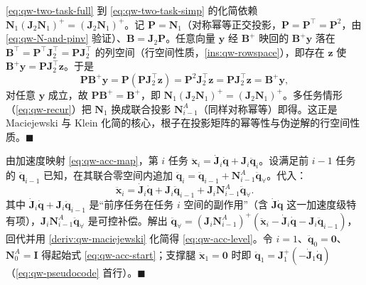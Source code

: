 \begin{derivation}[双任务化简恒等式 $\boldsymbol{N}_1(\boldsymbol{J}_2\boldsymbol{N}_1)^+=(\boldsymbol{J}_2\boldsymbol{N}_1)^+$ 的来由]\label{deriv:qw-maciejewski}
\cref{eq:qw-two-task-full} 到 \cref{eq:qw-two-task-simp} 的化简依赖 $\boldsymbol{N}_1(\boldsymbol{J}_2\boldsymbol{N}_1)^+=(\boldsymbol{J}_2\boldsymbol{N}_1)^+$。记 $\boldsymbol{P}=\boldsymbol{N}_1$（对称幂等正交投影，$\boldsymbol{P}=\boldsymbol{P}^\top=\boldsymbol{P}^2$，由 \cref{eq:qw-N-and-pinv} 验证）、$\boldsymbol{B}=\boldsymbol{J}_2\boldsymbol{P}$。任意向量 $\boldsymbol{y}$ 经 $\boldsymbol{B}^+$ 映回的 $\boldsymbol{B}^+\boldsymbol{y}$ 落在 $\boldsymbol{B}^\top=\boldsymbol{P}^\top\boldsymbol{J}_2^\top=\boldsymbol{P}\boldsymbol{J}_2^\top$ 的列空间（行空间性质，\cref{ins:qw-rowspace}），即存在 $\boldsymbol{z}$ 使 $\boldsymbol{B}^+\boldsymbol{y}=\boldsymbol{P}\boldsymbol{J}_2^\top\boldsymbol{z}$。于是
\[
  \boldsymbol{P}\boldsymbol{B}^+\boldsymbol{y}=\boldsymbol{P}(\boldsymbol{P}\boldsymbol{J}_2^\top\boldsymbol{z})=\boldsymbol{P}^2\boldsymbol{J}_2^\top\boldsymbol{z}=\boldsymbol{P}\boldsymbol{J}_2^\top\boldsymbol{z}=\boldsymbol{B}^+\boldsymbol{y},
\]
对任意 $\boldsymbol{y}$ 成立，故 $\boldsymbol{P}\boldsymbol{B}^+=\boldsymbol{B}^+$，即 $\boldsymbol{N}_1(\boldsymbol{J}_2\boldsymbol{N}_1)^+=(\boldsymbol{J}_2\boldsymbol{N}_1)^+$。多任务情形（\cref{eq:qw-recur}）把 $\boldsymbol{N}_1$ 换成联合投影 $\boldsymbol{N}_{i-1}^A$（同样对称幂等）即得。这正是 Maciejewski 与 Klein\cite{maciejewski1985obstacle} 化简的核心，根子在投影矩阵的幂等性与伪逆解的行空间性质。$\blacksquare$
\end{derivation}

\begin{derivation}\label{deriv:qw-acc-recur}
由加速度映射 \cref{eq:qw-acc-map}，第 $i$ 任务 $\ddot{\boldsymbol{x}}_i=\dot{\boldsymbol{J}}_i\dot{\boldsymbol{q}}+\boldsymbol{J}_i\ddot{\boldsymbol{q}}_i$。设满足前 $i-1$ 任务的 $\ddot{\boldsymbol{q}}_{i-1}$ 已知，在其联合零空间内追加 $\ddot{\boldsymbol{q}}_i=\ddot{\boldsymbol{q}}_{i-1}+\boldsymbol{N}_{i-1}^A\ddot{\boldsymbol{q}}_{\forall}$。代入：
\[
  \ddot{\boldsymbol{x}}_i=\dot{\boldsymbol{J}}_i\dot{\boldsymbol{q}}+\boldsymbol{J}_i\ddot{\boldsymbol{q}}_{i-1}+\boldsymbol{J}_i\boldsymbol{N}_{i-1}^A\ddot{\boldsymbol{q}}_{\forall}.
\]
其中 $\dot{\boldsymbol{J}}_i\dot{\boldsymbol{q}}+\boldsymbol{J}_i\ddot{\boldsymbol{q}}_{i-1}$ 是“前序任务在任务 $i$ 空间的副作用”（含 $\dot{\boldsymbol{J}}\dot{\boldsymbol{q}}$ 这一加速度级特有项），$\boldsymbol{J}_i\boldsymbol{N}_{i-1}^A\ddot{\boldsymbol{q}}_{\forall}$ 是可控补偿。解出 $\ddot{\boldsymbol{q}}_{\forall}=(\boldsymbol{J}_i\boldsymbol{N}_{i-1}^A)^+(\ddot{\boldsymbol{x}}_i-\dot{\boldsymbol{J}}_i\dot{\boldsymbol{q}}-\boldsymbol{J}_i\ddot{\boldsymbol{q}}_{i-1})$，回代并用 \cref{deriv:qw-maciejewski} 化简得 \cref{eq:qw-acc-level}。令 $i=1$、$\ddot{\boldsymbol{q}}_0=\mathbf{0}$、$\boldsymbol{N}_0^A=\mathbf{I}$ 得起始式 \cref{eq:qw-acc-start}；支撑腿 $\ddot{\boldsymbol{x}}_1=\mathbf{0}$ 时即 $\ddot{\boldsymbol{q}}_1=\boldsymbol{J}_1^+(-\dot{\boldsymbol{J}}_1\dot{\boldsymbol{q}})$（\cref{eq:qw-pseudocode} 首行）。$\blacksquare$
\end{derivation}

